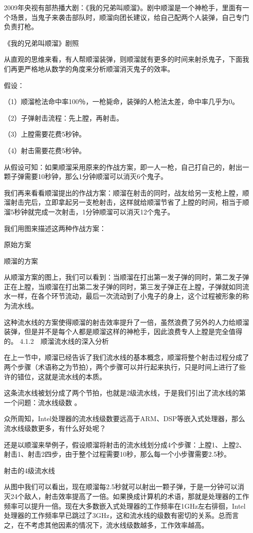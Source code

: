 \documentclass[12pt,UTF8]{ctexbook}
\begin{document}
2009年央视有部热播大剧：《我的兄弟叫顺溜》。剧中顺溜是一个神枪手，里面有一个场景，当鬼子来袭击部队时，顺溜向团长建议，给自己配两个人装弹，自己专门负责打枪。

《我的兄弟叫顺溜》剧照

从直观的思维来看，有人帮顺溜装弹，则顺溜就有更多的时间来射杀鬼子，下面我们再更严格地从数学的角度来分析顺溜消灭鬼子的效率。

假设：

（1）顺溜枪法命中率100％，一枪毙命，装弹的人枪法太差，命中率几乎为0。

（2）子弹射击流程：先上膛，再射击。

（3）上膛需要花费5秒钟。

（4）射击需要花费5秒钟。

从假设可知：如果顺溜采用原来的作战方案，即一人一枪，自己打自己的，射出一颗子弹需要10秒钟，那么1分钟顺溜可以消灭6个鬼子。

我们再来看看顺溜提出的作战方案：顺溜在射击的同时，战友给另一支枪上膛，顺溜射击完后，立即拿起另一支枪射击，这样就给顺溜节省了上膛的时间，相当于顺溜5秒钟就完成一次射击，1分钟顺溜可以消灭12个鬼子。

我们用图来描述这两种作战方案：

原始方案

顺溜的方案

从顺溜方案的图上，我们可以看到：当顺溜在打出第一发子弹的同时，第二发子弹正在上膛，当顺溜在打出第二发子弹的同时，第三发子弹正在上膛，子弹就如同流水一样，在各个环节流动，最后一次流动到了小鬼子的身上，这个过程被形象的称为流水线。

这种流水线的方案使得顺溜的射击效率提升了一倍，虽然浪费了另外的人力给顺溜装弹，但是并不是每个人都是顺溜这样的神枪手，因此浪费专人上膛是完全值得的。
4.1.2　顺溜流水线的深入分析

在上一节中，顺溜已经告诉了我们流水线的基本概念，顺溜将整个射击过程分成了两个步骤（术语称之为节拍），两个步骤可以并行起来执行，只是时间上进行了些许的错位，这就是流水线的本质。

这条流水线被划分成了两个节拍，也就是2级流水线，于是我们引出了流水线的第一个问题：流水线级数 。

众所周知，Intel处理器的流水线级数要远高于ARM、DSP等嵌入式处理器，那么流水线级数更多，有什么好处呢？

还是以顺溜来举例子，假设顺溜将射击的流水线划分成4个步骤：上膛1、上膛2、射击1、射击2四步，由于整个过程需要10秒，那么每一个小步骤需要2.5秒。

射击的4级流水线

从图中我们可以看出，现在顺溜每2.5秒就可以射出一颗子弹，于是一分钟可以消灭24个敌人，射击效率提高了一倍。如果换成计算机的术语，那就是处理器的工作频率可以提升一倍。现在大多数嵌入式处理器的工作频率在1GHz左右徘徊，Intel处理器的工作频率早已跳过了3GHz，这和流水线的级数有密切的关系。总而言之，在不考虑其他因素的情况下，流水线级数越多，工作效率越高。
\end{document}
